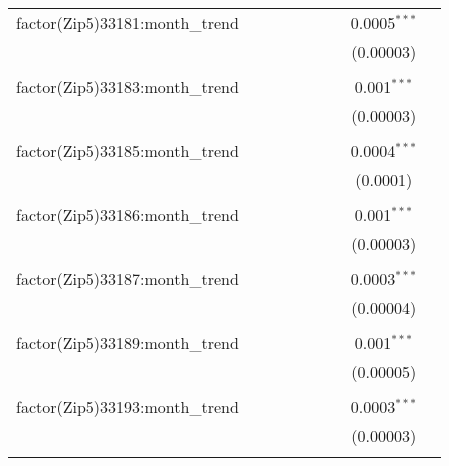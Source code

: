\begin{table}[H]
{\begin{tabular}{@{\extracolsep{5pt}}lcccccccc}
  factor(Zip5)33181:month\_trend &  &  &  &  &  &  & 0.0005$^{***}$ &  \\  

   &  &  &  &  &  &  & (0.00003) &  \\  

   & & & & & & & & \\  

  factor(Zip5)33183:month\_trend &  &  &  &  &  &  & 0.001$^{***}$ &  \\  

   &  &  &  &  &  &  & (0.00003) &  \\  

   & & & & & & & & \\  

  factor(Zip5)33185:month\_trend &  &  &  &  &  &  & 0.0004$^{***}$ &  \\  

   &  &  &  &  &  &  & (0.0001) &  \\  

   & & & & & & & & \\  

  factor(Zip5)33186:month\_trend &  &  &  &  &  &  & 0.001$^{***}$ &  \\  

   &  &  &  &  &  &  & (0.00003) &  \\  

   & & & & & & & & \\  

  factor(Zip5)33187:month\_trend &  &  &  &  &  &  & 0.0003$^{***}$ &  \\  

   &  &  &  &  &  &  & (0.00004) &  \\  

   & & & & & & & & \\  

  factor(Zip5)33189:month\_trend &  &  &  &  &  &  & 0.001$^{***}$ &  \\  

   &  &  &  &  &  &  & (0.00005) &  \\  

   & & & & & & & & \\  

  factor(Zip5)33193:month\_trend &  &  &  &  &  &  & 0.0003$^{***}$ &  \\  

   &  &  &  &  &  &  & (0.00003) &  \\  

   & & & & & & & & \\  


\end{tabular}}
\end{table}
